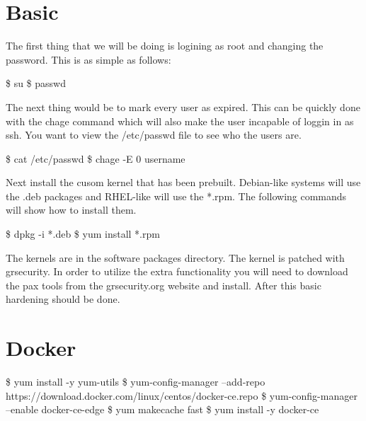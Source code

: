 \section{Basic}
  The first thing that we will be doing is logining as root and changing the password. This is as simple as follows:

  \$ su
  \$ passwd

  The next thing would be to mark every user as expired. This can be quickly done with the chage command which will also make the user incapable of loggin in as ssh. You want to view the /etc/passwd file to see who the users are.

  \$ cat /etc/passwd
  \$ chage -E 0 username

  Next install the cusom kernel that has been prebuilt. Debian-like systems will use the .deb packages and RHEL-like will use the *.rpm. The following commands will show how to install them.

  \$ dpkg -i *.deb
  \$ yum install *.rpm

  The kernels are in the software packages directory. The kernel is patched with grsecurity. In order to utilize the extra functionality you will need to download the pax tools from the grsecurity.org website and install. After this basic hardening should be done.

\section{Docker}
  \$ yum install -y yum-utils
  \$ yum-config-manager --add-repo https://download.docker.com/linux/centos/docker-ce.repo
  \$ yum-config-manager --enable docker-ce-edge
  \$ yum makecache fast
  \$ yum install -y docker-ce
